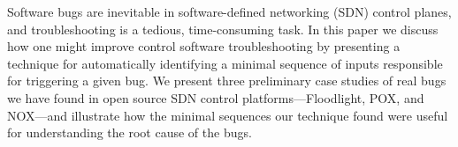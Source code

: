 Software bugs are inevitable in software-defined networking (SDN) control planes,
and troubleshooting
is a tedious, time-consuming task.
In this paper we discuss how one might improve
control software troubleshooting by presenting a technique
for automatically identifying
a minimal sequence of inputs responsible for triggering a given bug.
We present three preliminary case studies of real bugs we have found in open source SDN control
platforms---Floodlight, POX, and NOX---and
illustrate how the minimal sequences our technique found were useful for
understanding the root cause of the bugs.
